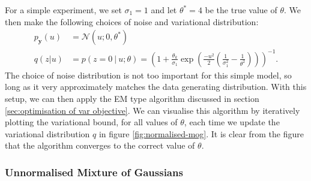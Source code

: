 \documentclass[11pt, oneside]{article}
\newcommand{\pnoise}{p_{ \mathbf y}}
\theoremstyle{definition}
\begin{document}
For a simple experiment, we set $\sigma_1 = 1$ and let $\theta^* = 4$ be the true value of $\theta$. We then make the following choices of noise and variational distribution:
\begin{align}
    \label{eq:normalised mog posterior}
    \pnoise(u) &= \mathcal{N}(u; 0, \theta^*) \\
    q(z|u) &= p(z=0 \ | \ u; \theta) = \left(  1 + \frac{\theta_k}{\sigma_1} \exp \left(\frac{- u^2}{2} \left( \frac{1}{\sigma_1^2} - \frac{1}{\theta^2} \right) \right) \right)^{-1}.
\end{align}
The choice of noise distribution is not too important for this simple model, so long as it very approximately matches the data generating distribution. With this setup, we can then apply the EM type algorithm discussed in section \ref{sec:optimisation of var objective}. We can visualise this algorithm by iteratively plotting the variational bound, for all values of $\theta$, each time we update the variational distribution $q$ in figure \ref{fig:normalised-mog}. It is clear from the figure that the algorithm converges to the correct value of $\theta$.



\subsubsection{Unnormalised Mixture of Gaussians}
\end{document}
